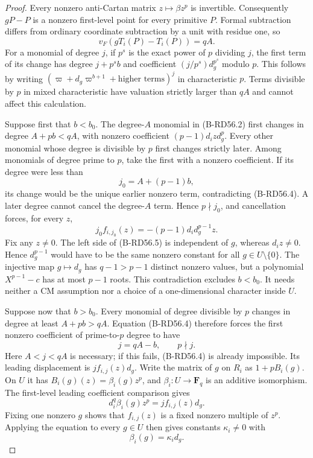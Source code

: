 \begin{proof}
Every nonzero anti-Cartan matrix $z\mapsto\beta z^p$ is invertible.
Consequently $gP-P$ is a nonzero first-level point for every primitive
$P$. Formal subtraction differs from ordinary coordinate subtraction
by a unit with residue one, so
\[
                        v_F(gT_i(P)-T_i(P))=qA.          \tag{B-RD56.4}
\]
For a monomial of degree $j$, if $p^s$ is the exact power of $p$
dividing $j$, the first term of its change has degree
$j+p^s b$ and coefficient $(j/p^s)d_g^{p^s}$ modulo $p$.
This follows by writing $(\varpi+d_g\varpi^{b+1}+
\text{higher terms})^j$ in characteristic $p$.
Terms divisible by $p$ in mixed characteristic have valuation
strictly larger than $qA$ and cannot affect this calculation.

Suppose first that $b<b_0$. The degree-$A$ monomial in (B-RD56.2)
first changes in degree $A+pb<qA$, with nonzero coefficient
$(p-1)d_i z d_g^p$. Every other monomial whose degree is divisible
by $p$ first changes strictly later. Among monomials of degree
prime to $p$, take the first with a nonzero coefficient. If its
degree were less than
\[
                           j_0=A+(p-1)b,
\]
its change would be the unique earlier nonzero term, contradicting
(B-RD56.4). A later degree cannot cancel the degree-$A$ term.
Hence $p\nmid j_0$, and cancellation forces, for every $z$,
\[
             j_0 f_{i,j_0}(z)
                     =-(p-1)d_i d_g^{p-1}z.            \tag{B-RD56.5}
\]
Fix any $z\ne0$. The left side of (B-RD56.5) is independent of
$g$, whereas $d_i z\ne0$. Hence $d_g^{p-1}$ would have to be the
same nonzero constant for all $g\in U\setminus\{0\}$.
The injective map $g\mapsto d_g$ has $q-1>p-1$ distinct nonzero
values, but a polynomial $X^{p-1}-c$ has at most $p-1$ roots.
This contradiction excludes $b<b_0$. It needs neither a CM assumption
nor a choice of a one-dimensional character inside $U$.

Suppose now that $b>b_0$. Every monomial of degree divisible
by $p$ changes in degree at least $A+pb>qA$.
Equation (B-RD56.4) therefore forces the first nonzero coefficient
of prime-to-$p$ degree to have
\[
                         j=qA-b,\qquad p\nmid j.
\]
Here $A<j<qA$ is necessary; if this fails, (B-RD56.4) is
already impossible. Its leading displacement is
$j f_{i,j}(z)d_g$.
Write the matrix of $g$ on $R_i$ as $1+pB_i(g)$.
On $U$ it has $B_i(g)(z)=\beta_i(g)z^p$, and
$\beta_i:U\to\mathbf F_q$ is an additive isomorphism.
The first-level leading coefficient comparison gives
\[
               d_i^q\beta_i(g)z^p
                           =j f_{i,j}(z)d_g.            \tag{B-RD56.6}
\]
Fixing one nonzero $g$ shows that $f_{i,j}(z)$ is a fixed
nonzero multiple of $z^p$. Applying the equation to every
$g\in U$ then gives constants $\kappa_i\ne0$ with
\[
                          \beta_i(g)=\kappa_i d_g.
                                                        \tag{B-RD56.7}
\]


\end{proof}
